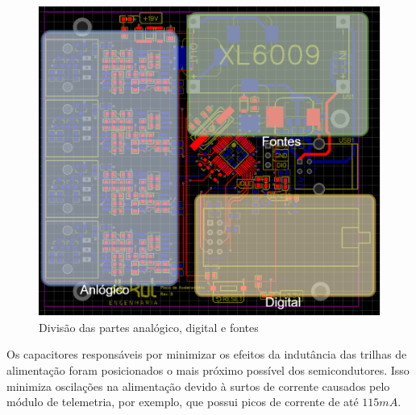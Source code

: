 \documentclass[11pt]{abntex2}
\begin{document}
				\begin{figure}[!ht]
					\centering
					\includegraphics[width=\linewidth]{../Fotos/analogDigitalFonte.png}
					\caption{Divisão das partes analógico, digital e fontes}
				\end{figure}

				Os capacitores responsáveis por minimizar os efeitos da
				indutância das trilhas de alimentação foram posicionados o mais
				próximo possível dos semicondutores. Isso minimiza oscilações na
				alimentação devido à surtos de corrente causados pelo módulo de
				telemetria, por exemplo, que possui picos de corrente de até $115mA$.
\end{document}
